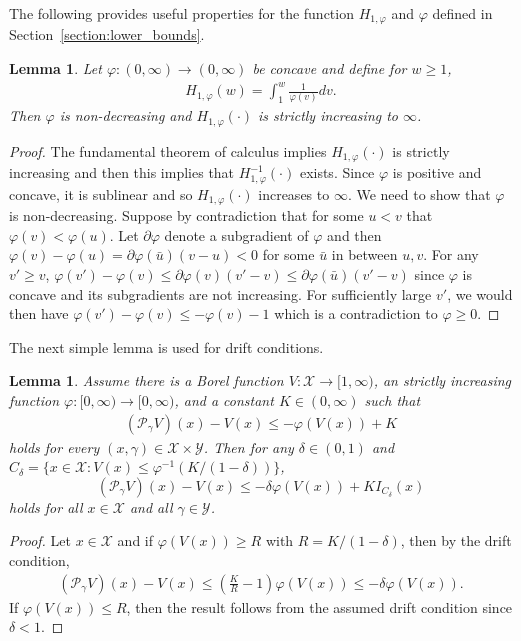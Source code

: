 \documentclass[12pt]{article}
\theoremstyle{plain}
\newtheorem{lemma}[theorem]{Lemma}
\theoremstyle{remark}
\newcommand{\R}{\mathbb{R}}
\renewcommand{\P}{\mathcal{P}}
\newcommand{\X}{\mathcal{X}}
\newcommand{\Y}{\mathcal{Y}}
\let\temp\phi
\let\phi\varphi
\let\varphi\temp
\newcommand{\eq}[1]{\begin{align*}#1\end{align*}}
\begin{document}
\begin{appendix}
The following provides useful properties for the function $H_{1, \phi}$ and $\phi$ defined in Section~\ref{section:lower_bounds}.

\begin{lemma}
\label{lemma:H_properties}
Let $\phi : (0, \infty) \to (0, \infty)$ be concave and define for $w \ge 1$,
\begin{align}
H_{1, \phi}(w) = \int_{1}^w \frac{1}{\phi(v)} dv.
\end{align}
Then $\phi$ is non-decreasing and $H_{1, \phi}(\cdot)$ is strictly increasing to $\infty$.
\end{lemma}

\begin{proof}
The fundamental theorem of calculus implies $H_{1, \phi}(\cdot)$ is strictly increasing and then this implies that $H_{1, \phi}^{-1}(\cdot)$ exists.
Since $\phi$ is positive and concave, it is sublinear and so $H_{1, \phi}(\cdot)$ increases to $\infty$.
We need to show that $\phi$ is non-decreasing.
Suppose by contradiction that for some $u < v$ that $\phi(v) < \phi(u)$.
Let $\partial \phi$ denote a subgradient of $\phi$ and then $\phi(v) - \phi(u) = \partial \phi(\bar{u}) (v - u) < 0$ for some $\bar{u}$ in between $u, v$.
For any $v' \ge v$, $\phi(v') - \phi(v) \le \partial \phi(v) (v' - v) \le \partial \phi(\bar{u}) (v' - v)$ since $\phi$ is concave and its subgradients are not increasing.
For sufficiently large $v'$, we would then have $\phi(v') - \phi(v) \le - \phi(v) - 1$ which is a contradiction to $\phi \ge 0$.
\end{proof}

\noindent The next simple lemma is used for drift conditions.

\begin{lemma}
\label{lemma:simult_subgeo_drift}
Assume there is a Borel function $V : \X \to [1, \infty)$, an strictly increasing function $\phi : [0, \infty) \to [0, \infty)$, and a constant $K \in (0, \infty)$ such that 
\begin{align}
(\P_\gamma V)(x) - V(x)
\le -\phi( V(x) ) + K
\end{align}
holds for every $(x, \gamma) \in  \X \times \Y$.
Then for any $\delta \in (0, 1)$ and $C_\delta = \{x \in \X : V(x) \le \phi^{-1}( K/(1 - \delta) ) \}$,
\[
(\P_\gamma V)(x) - V(x)
\le -\delta \phi( V(x) ) + K I_{C_\delta}(x)
\]
holds for all $x \in \X$ and all $\gamma \in \Y$.
\end{lemma}

\begin{proof}
Let $x \in \X$ and if $\phi(V(x)) \ge R$ with $R =  K / (1 - \delta)$, then by the drift condition,
\eq{
(\P_\gamma V)(x) - V(x)
\le \left( \frac{K}{R} - 1 \right) \phi( V(x) )
\le -\delta \phi( V(x) ).
}
If $\phi(V(x)) \le R$, then the result follows from the assumed drift condition since $\delta < 1$.
\end{proof}


\end{appendix}


\end{document}
